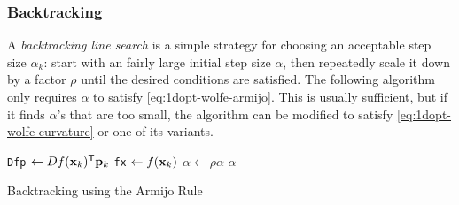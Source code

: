 \subsubsection*{Backtracking}

A \emph{backtracking line search} is a simple strategy for choosing an acceptable step size $\alpha_k$: start with an fairly large initial step size $\alpha$, then repeatedly scale it down by a factor $\rho$ until the desired conditions are satisfied.
The following algorithm only requires $\alpha$ to satisfy \eqref{eq:1dopt-wolfe-armijo}.
This is usually sufficient, but if it finds $\alpha$'s that are too small, the algorithm can be modified to satisfy \eqref{eq:1dopt-wolfe-curvature} or one of its variants.

\begin{algorithm}[H]
\begin{algorithmic}[1]
    \State \texttt{Dfp} $\gets Df(\mathbf{x}_k)^{\mathsf T}\mathbf{p}_k$
    \State \texttt{fx} $\gets f(\mathbf{x}_k)$
        \State $\alpha \gets \rho\alpha$
    \EndWhile
    \Return $\alpha$
\EndProcedure
\end{algorithmic}
\caption{Backtracking using the Armijo Rule}
\label{Alg:opt1d-backtracking}
\end{algorithm}

